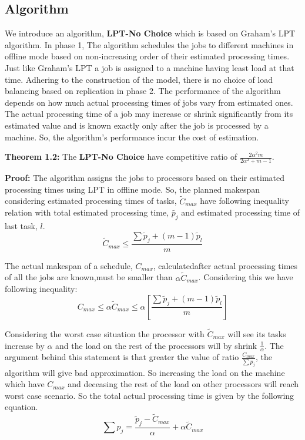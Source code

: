 \documentclass[10pt, conference, compsocconf]{IEEEtran}
\begin{document}
 
 
\subsection{Algorithm}

We introduce an algorithm, \textbf{LPT-No Choice} which
is based on Graham's LPT algorithm. In phase 1, The
algorithm schedules the jobs to different machines in
offline mode based on non-increasing order of their
estimated processing times. Just like Graham's LPT a
job is assigned to a machine having least load at that
time. Adhering to the construction of the model, there
is no choice of load balancing based on replication in
phase 2. The performance of the algorithm depends on
how much actual processing times of jobs vary from
estimated ones. The actual processing time of a job may
increase or shrink significantly from its estimated value
and is known exactly only after the job is processed by
a machine. So, the algorithm's performance incur the
cost of estimation.

\textbf{Theorem 1.2:} The \textbf{LPT-No Choice} have competitive
ratio of $ \frac{2\alpha^{2}m}{2\alpha^{2}+ m-1}$.

\textbf{Proof:} The algorithm assigns the jobs to processors
based on their estimated processing times using LPT in
offline mode. So, the planned makespan considering estimated
processing times of tasks, $\tilde{C}_{max}$ have following
inequality relation with total estimated processing time,
$\tilde{p_j}$ and estimated processing time of last task, $l$. 
\begin{equation}
\tilde C_{max}\leq  \frac{\sum{\tilde p_j + (m-1) \tilde p_l} }{m}
\end{equation}

The actual makespan of a schedule, $C_{max}$, calculatedafter actual processing times of all the jobs are known,must be smaller than $\alpha\tilde C_{max}$. Considering this we have following inequality:
\begin{equation}
 C_{max}\leq \alpha \tilde C_{max}\leq \alpha [\frac{\sum{\tilde p_j + (m-1) \tilde p_l} }{m}] 
\end{equation} 

Considering the worst case situation the processor with $\tilde C_{max}$ will see its tasks increase by $\alpha$  and the load on the  rest of the processors will by shrink  $\frac{1}{\alpha}$.  The argument behind this statement is that greater the value of ratio $\frac{C_{max}}{\sum{p_j}}$, the algorithm will give bad approximation. So increasing the load on the machine which have $C_{max} $ and deceasing the rest of the load on other processors will reach worst case scenario. So the total actual processing time is given by the  following equation.
 \begin{equation}
 \sum {p_j} = \frac{\tilde p_j- \tilde C_{max}}{\alpha} + \alpha \tilde C_{max}
 \end{equation}
 
\end{document}
